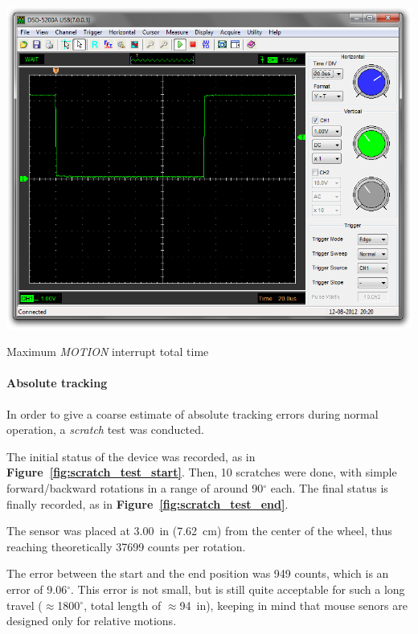 \documentclass[a4paper,10pt]{article}
\makeatletter
\newenvironment{figurehere}{\def\@captype{figure}\vspace{2ex}}{\vspace{2ex}}
\newcommand{\citef}[1]{\textbf{Figure~\ref{#1}}}
\makeatother
\begin{document}
\begin{multicols}{2}
\begin{figurehere}
	\centering
	\includegraphics[keepaspectratio=true,width=\columnwidth]{images/motion_tot_max.png}
	\caption{Maximum \emph{MOTION} interrupt total time}
	\label{fig:motion_tot_max}
\end{figurehere}


\paragraph{Absolute tracking}
In order to give a coarse estimate of absolute tracking errors during normal
operation, a \emph{scratch} test was conducted.

The initial status of the device was recorded, as in \citef{fig:scratch_test_start}.
Then, 10 scratches were done, with simple forward/backward rotations in a
range of around 90$^\circ$ each. The final status is finally recorded, as in
\citef{fig:scratch_test_end}.

The sensor was placed at 3.00~in (7.62~cm) from the center of the wheel,
thus reaching theoretically 37699 counts per rotation.

The error between the start and the end position was 949 counts, which is an
error of 9.06$^\circ$. This error is not small, but is still quite acceptable
for such a long travel ($\approx$1800$^\circ$, total length of $\approx$94~in),
keeping in mind that mouse senors are designed only for relative motions.


\end{multicols}
\end{document}
